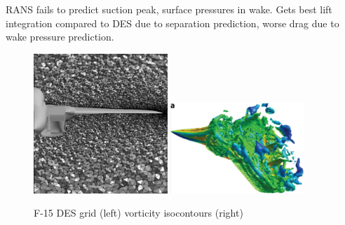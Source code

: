 \documentclass[journal]{new-aiaa}
\begin{document}
RANS fails to predict suction peak, surface pressures in wake.  Gets best lift integration compared to DES due to separation prediction, worse drag due to wake pressure prediction.












\begin{figure}[H]
\begin{center}
\includegraphics[width=0.45\textwidth]{Images/logan/forsythe2004detachededdy_f15grid.pdf}
\includegraphics[width=0.45\textwidth]{Images/logan/spalart2009detachededdy_f15des.pdf}
\caption{ F-15 DES grid (left) \cite{forsythe2004detachededdy} vorticity isocontours (right) \cite{spalart2009detachededdy} }
\label{fig:f15des}
\end{center}
\end{figure}
\end{document}
